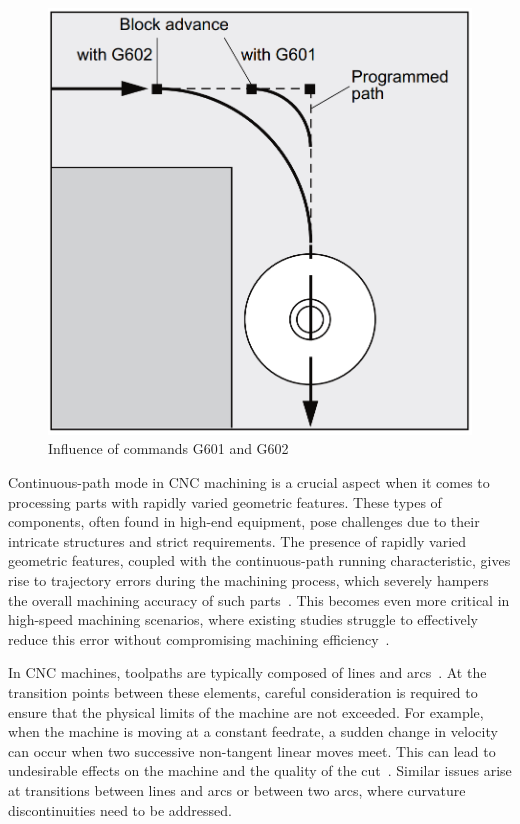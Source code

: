 \begin{figure}[H]
 	\centerline{\includegraphics[scale=.25]{figures/conti3.png}}
 	\caption{Influence of commands G601 and G602~\cite{sinumericmanual}}
 	\label{C4}
\end{figure}
 
 
 
Continuous-path mode in CNC machining is a crucial aspect when it comes to processing parts with rapidly varied geometric features. These types of components, often found in high-end equipment, pose challenges due to their intricate structures and strict requirements. The presence of rapidly varied geometric features, coupled with the continuous-path running characteristic, gives rise to trajectory errors during the machining process, which severely hampers the overall machining accuracy of such parts~\cite{Shahzadeh.2018}. This becomes even more critical in high-speed machining scenarios, where existing studies struggle to effectively reduce this error without compromising machining efficiency~\cite{Li.2018}.

In CNC machines, toolpaths are typically composed of lines and arcs~\cite{Liu.2020}. At the transition points between these elements, careful consideration is required to ensure that the physical limits of the machine are not exceeded. For example, when the machine is moving at a constant feedrate, a sudden change in velocity can occur when two successive non-tangent linear moves meet. This can lead to undesirable effects on the machine and the quality of the cut~\cite{Boujelbene.2004}. Similar issues arise at transitions between lines and arcs or between two arcs, where curvature discontinuities need to be addressed. 

